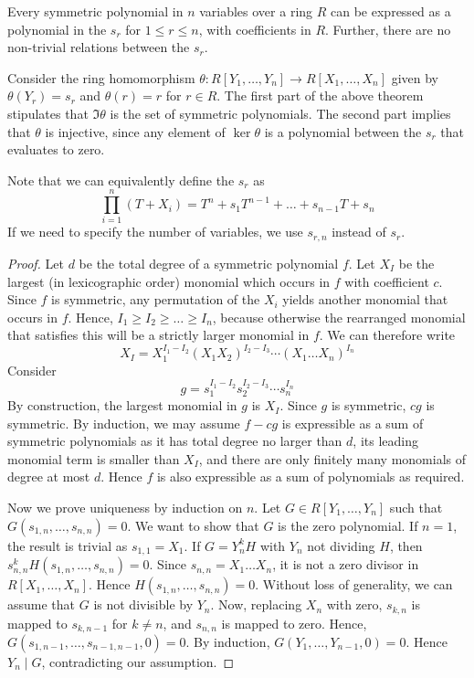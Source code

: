 \begin{theorem}
	Every symmetric polynomial in \( n \) variables over a ring \( R \) can be expressed as a polynomial in the \( s_r \) for \( 1 \leq r \leq n \), with coefficients in \( R \).
	Further, there are no non-trivial relations between the \( s_r \).
\end{theorem}
\begin{remark}
	Consider the ring homomorphism \( \theta \colon R[Y_1, \dots, Y_n] \to R[X_1, \dots, X_n] \) given by \( \theta(Y_r) = s_r \) and \( \theta(r) = r \) for \( r \in R \).
	The first part of the above theorem stipulates that \( \Im \theta \) is the set of symmetric polynomials.
	The second part implies that \( \theta \) is injective, since any element of \( \ker \theta \) is a polynomial between the \( s_r \) that evaluates to zero.

	Note that we can equivalently define the \( s_r \) as
	\[ \prod_{i=1}^n (T + X_i) = T^n + s_1 T^{n-1} + \dots + s_{n-1} T + s_n \]
	If we need to specify the number of variables, we use \( s_{r,n} \) instead of \( s_r \).
\end{remark}
\begin{proof}
	Let \( d \) be the total degree of a symmetric polynomial \( f \).
	Let \( X_I \) be the largest (in lexicographic order) monomial which occurs in \( f \) with coefficient \( c \).
	Since \( f \) is symmetric, any permutation of the \( X_i \) yields another monomial that occurs in \( f \).
	Hence, \( I_1 \geq I_2 \geq \dots \geq I_n \), because otherwise the rearranged monomial that satisfies this will be a strictly larger monomial in \( f \).
	We can therefore write
	\[ X_I = X_1^{I_1 - I_2}(X_1 X_2)^{I_2 - I_3} \cdots (X_1 \dots X_n)^{I_n} \]
	Consider
	\[ g = s_1^{I_1 - I_2} s_2^{I_2 - I_3} \cdots s_n^{I_n} \]
	By construction, the largest monomial in \( g \) is \( X_I \).
	Since \( g \) is symmetric, \( cg \) is symmetric.
	By induction, we may assume \( f - cg \) is expressible as a sum of symmetric polynomials as it has total degree no larger than \( d \), its leading monomial term is smaller than \( X_I \), and there are only finitely many monomials of degree at most \( d \).
	Hence \( f \) is also expressible as a sum of polynomials as required.

	Now we prove uniqueness by induction on \( n \).
	Let \( G \in R[Y_1, \dots, Y_n] \) such that \( G(s_{1,n}, \dots, s_{n,n}) = 0 \).
	We want to show that \( G \) is the zero polynomial.
	If \( n = 1 \), the result is trivial as \( s_{1,1} = X_1 \).
	If \( G = Y^k_n H \) with \( Y_n \) not dividing \( H \), then \( s_{n,n}^k H(s_{1,n}, \dots, s_{n,n}) = 0 \).
	Since \( s_{n,n} = X_1 \dots X_n \), it is not a zero divisor in \( R[X_1, \dots, X_n] \).
	Hence \( H(s_{1,n}, \dots, s_{n,n}) = 0 \).
	Without loss of generality, we can assume that \( G \) is not divisible by \( Y_n \).
	Now, replacing \( X_n \) with zero, \( s_{k,n} \) is mapped to \( s_{k,n-1} \) for \( k \neq n \), and \( s_{n,n} \) is mapped to zero.
	Hence, \( G(s_{1,n-1}, \dots, s_{n-1,n-1}, 0) = 0 \).
	By induction, \( G(Y_1, \dots, Y_{n-1}, 0) = 0 \).
	Hence \( Y_n \mid G \), contradicting our assumption.
\end{proof}
